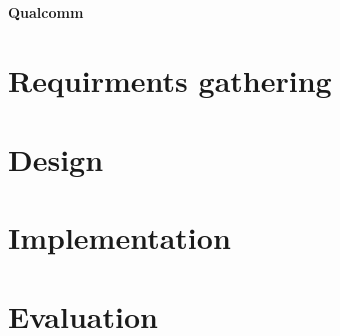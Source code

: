 \documentclass{l4proj}
\begin{document}

\subsubsection{Qualcomm} %
\label{ssub:qualcomm}







\chapter{Requirments gathering} %
\label{cha:requirments_gathering}





\chapter{Design} %
\label{cha:design}





\chapter{Implementation} %
\label{cha:implementation}





\chapter{Evaluation} %
\label{cha:evaluation}
\end{document}
